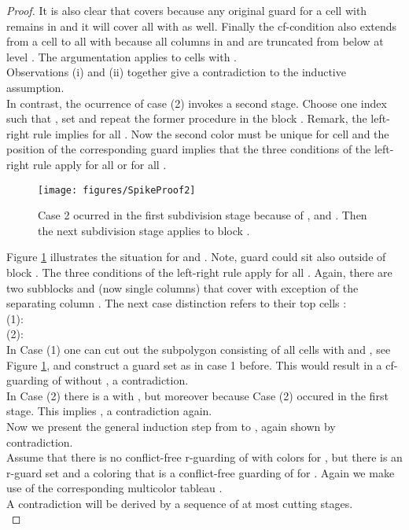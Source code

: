 \documentclass[a4paper,USenglish,numberwithinsect]{lipics}
\theoremstyle{plain}
\begin{document}
\begin{proof}
It is also clear that  covers  because any original guard
for a cell 
with   remains in  and it will cover all 
with  as well. 
Finally the cf-condition also extends from a cell  to all
 with  because all columns in  and 
 are truncated from
below at level . The  argumentation applies to cells 
with . 
\\
Observations (i) and (ii) together give a contradiction to the
inductive assumption.\\
In contrast, the ocurrence of case (2)  invokes a second  stage.
Choose one index  such that  , set 
and  repeat the former procedure in the block . Remark, the left-right rule
implies  for all .  
Now the second color  must be unique for cell  and the position
of the corresponding guard  implies that the three conditions of the left-right rule apply 
for all  or for all .
\begin{figure}
\centering
    \texttt{[image: figures/SpikeProof2]}
\caption{Case 2 ocurred in the first subdivision stage because of ,  and . Then
the next subdivision stage applies to block .}
\label{r-vis-indStep2}
\end{figure}
Figure \ref{r-vis-indStep2} illustrates the situation for   and  .
Note, guard  could sit also outside of block .
The three conditions of the left-right rule apply for all . 
Again, there are two subblocks   and  (now single columns) that cover  
with exception of the separating column . The next case distinction 
refers to their  top cells : \\
  (1): \\
  (2): \\
In Case (1) one can cut out the subpolygon  consisting of all cells 
with  and , see Figure \ref{r-vis-indStep2}, and construct 
a guard set  as in case 1 before. This would result in a cf-guarding of  without ,
a contradiction. 
\\
In  Case (2) there is a   with  , but moreover 
 because Case (2) occured in the first stage. This implies ,
a contradiction again.
\\
Now we present the  general induction step from  to , again shown by contradiction. \\
Assume  that  there is
no conflict-free r-guarding of  with
 colors for , but there  is an r-guard set  and a
coloring  that is a conflict-free guarding of 
for . Again we make use of the corresponding  multicolor tableau
. \\
A contradiction will be derived by  a sequence of at most 
cutting stages. \\

\end{proof}
\end{document}
